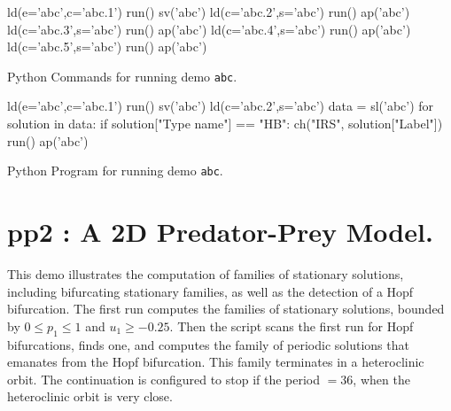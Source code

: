 \documentclass[12pt]{report}
\begin{document}
\begin{table}[htbp]
{\small 
\begin{center} 
\begin{boxedverbatim}
ld(e='abc',c='abc.1')
run()
sv('abc')
ld(c='abc.2',s='abc')
run()
ap('abc')
ld(c='abc.3',s='abc')
run()
ap('abc')
ld(c='abc.4',s='abc')
run()
ap('abc')
ld(c='abc.5',s='abc')
run()
ap('abc')
\end{boxedverbatim}
\end{center}
}
\caption{Python Commands for running demo {\tt abc}.}
\label{tbl:demo_abcP1}
\end{table}

\begin{table}[htbp]
{\small
\begin{center}
\begin{boxedverbatim}
ld(e='abc',c='abc.1')
run()
sv('abc')
ld(c='abc.2',s='abc')
data = sl('abc')
for solution in data:
    if solution["Type name"] == "HB":
        ch("IRS", solution["Label"])
        run()
        ap('abc')

\end{boxedverbatim}
\end{center}
}
\caption{Python Program for running demo {\tt abc}.}
\label{tbl:demo_abcP2}
\end{table}


\newpage
\section{ pp2 : A 2D Predator-Prey Model.} \label{sec:Demos_pp2}
This demo illustrates the computation of families of stationary
solutions, including bifurcating stationary families, as well as
the detection of a Hopf bifurcation.
The first run computes the families of stationary solutions, bounded
by $0\le p_1\le 1$ and $u_1 \ge -0.25$. Then the script 
scans the first run for Hopf bifurcations, finds one, and computes
the family of periodic solutions that emanates
from the Hopf bifurcation. This family terminates in
a heteroclinic orbit. The continuation is configured to stop if the period
$=36$, when the heteroclinic orbit is very close.
\end{document}
